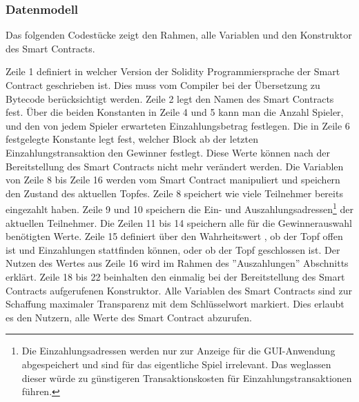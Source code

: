 \subsubsection{Datenmodell}
Das folgenden Codestücke zeigt den Rahmen, alle Variablen und den Konstruktor des Smart Contracts.

Zeile 1 definiert in welcher Version der Solidity Programmiersprache der Smart Contract geschrieben ist. Dies muss vom Compiler bei der Übersetzung zu Bytecode berücksichtigt werden. Zeile 2 legt den Namen des Smart Contracts fest. Über die beiden Konstanten in Zeile 4 und 5 kann man die Anzahl Spieler, und den von jedem Spieler erwarteten Einzahlungsbetrag festlegen. Die in Zeile 6 festgelegte Konstante legt fest, welcher Block ab der letzten Einzahlungstransaktion den Gewinner festlegt. Diese Werte können nach der Bereitstellung des Smart Contracts nicht mehr verändert werden. Die Variablen von Zeile 8 bis Zeile 16 werden vom Smart Contract manipuliert und speichern den Zustand des aktuellen Topfes. Zeile 8 speichert wie viele Teilnehmer bereits eingezahlt haben. Zeile 9 und 10 speichern die Ein- und Auszahlungsadressen\footnote{Die Einzahlungsadressen werden nur zur Anzeige für die GUI-Anwendung abgespeichert und sind für das eigentliche Spiel irrelevant. Das weglassen dieser würde zu günstigeren Transaktionskosten für Einzahlungstransaktionen führen.} der aktuellen Teilnehmer. Die Zeilen 11 bis 14 speichern alle für die Gewinnerauswahl benötigten Werte. Zeile 15 definiert über den Wahrheitswert , ob der Topf offen ist und Einzahlungen stattfinden können, oder ob der Topf geschlossen ist. Der Nutzen des Wertes aus Zeile 16 wird im Rahmen des ''Auszahlungen'' Abschnitts erklärt. Zeile 18 bis 22 beinhalten den einmalig bei der Bereitstellung des Smart Contracts aufgerufenen Konstruktor. Alle Variablen des Smart Contracts sind zur Schaffung maximaler Transparenz mit dem Schlüsselwort  markiert. Dies erlaubt es den Nutzern, alle Werte des Smart Contract abzurufen.

